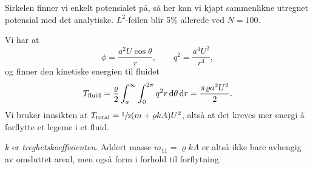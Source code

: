Sirkelen finner vi enkelt potensialet på, så her kan vi kjapt sammenlikne utregnet potensial med det analytiske.
$L^2$-feilen blir 5\% allerede ved $N = 100$.

Vi har at
\[
        \phi = \frac{a^2 U \cos{\theta}}{r}, \qquad q^2 = \frac{a^4 U^2}{r^4},
\]
og finner den kinetiske energien til fluidet
\[
        T_{\mathrm{fluid}} = \frac{\varrho}{2} \int_{a}^{\infty} \int_{0}^{2\pi} q^2 r \,\mathrm{d} \theta\,\mathrm{d} r = \frac{\pi \varrho a^2 U^2}{2}.
\]
Vi bruker innsikten at $T_{\mathrm{total}} = \sfrac{1}{2} (m+\varrho kA) U^2$, altså at det kreves mer energi å forflytte et legeme i et fluid.

\vspace{1em}
$k$ er \emph{treghetskoeffisienten}.
Addert masse $m_{11} = \varrho kA$ er altså ikke bare avhengig av omsluttet areal, men også form i forhold til forflytning.
